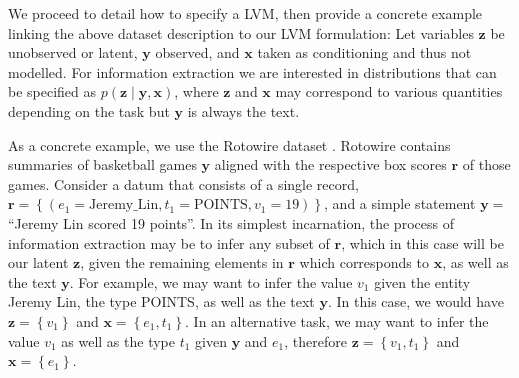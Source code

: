\documentclass[12pt]{article}
\newcommand\set[1]{\left\{#1\right\}}
\newcommand{\ba}{\mathbf{a}}
\newcommand{\br}{\mathbf{r}}
\newcommand{\bx}{\mathbf{x}}
\newcommand{\by}{\mathbf{y}}
\newcommand{\bz}{\mathbf{z}}
\begin{document}
We proceed to detail how to specify a LVM,
then provide a concrete example linking the above dataset description to our LVM formulation:
Let variables $\bz$ be unobserved or latent, $\by$ observed, and $\bx$ taken as conditioning
and thus not modelled.
For information extraction we are interested in distributions
that can be specified as $p(\bz\mid\by,\bx)$,
where $\bz$ and $\bx$ may correspond to various quantities depending on the task
but $\by$ is always the text.

As a concrete example, we use the Rotowire dataset \citep{wiseman2017d2t}.
Rotowire contains summaries of basketball games $\by$ aligned with the respective
box scores $\br$ of those games.
Consider a datum that consists of a single record,
$\br = \set{(e_1 = \textrm{Jeremy\_Lin}, t_1 = \textrm{POINTS}, v_1 = 19)}$,
and a simple statement $\by = $``Jeremy Lin scored 19 points''.
In its simplest incarnation, the process of information extraction may be to infer any
subset of $\br$, which in this case will be our latent $\bz$, given the remaining elements in $\br$
which corresponds to $\bx$, as well as the text $\by$.
For example, we may want to infer the value $v_1$ given 
the entity Jeremy Lin, the type POINTS, as well as the text $\by$.
In this case, we would have $\bz = \set{v_1}$ and $\bx = \set{e_1,t_1}$.
In an alternative task, we may want to infer the value $v_1$ 
as well as the type $t_1$ given $\by$ and $e_1$, therefore $\bz = \set{v_1,t_1}$ and $\bx=\set{e_1}$.

\begin{comment}
Note that we are not constrained to setting $\bz$ to subsets of $\br$.
We also consider the case where $\bz$ includes alignments from individual words $y_t$
to records $r_i$. We denote the alignments $\ba = \set{a_1,\ldots,a_T}$,
where each $a_t$ is associated with $y_t$ and selects a record $r_i$ such that $a_t = i$.
\end{comment}
\end{document}
